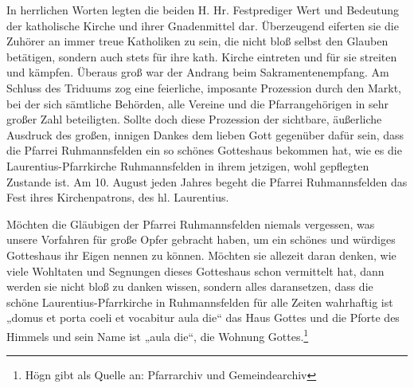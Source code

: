 \documentclass[12pt,a4paper]{book}
\begin{document}
In herrlichen Worten legten die beiden H. Hr. Festprediger Wert und
Bedeutung der katholische Kirche und ihrer Gnadenmittel dar. Überzeugend
eiferten sie die Zuhörer an immer treue Katholiken zu sein, die nicht
bloß selbst den Glauben betätigen, sondern auch stets für ihre kath.
Kirche eintreten und für sie streiten und kämpfen. Überaus groß war der
Andrang beim Sakramentenempfang. Am Schluss des Triduums zog eine
feierliche, imposante Prozession durch den Markt, bei der sich sämtliche
Behörden, alle Vereine und die Pfarrangehörigen in sehr großer Zahl
beteiligten. Sollte doch diese Prozession der sichtbare, äußerliche
Ausdruck des großen, innigen Dankes dem lieben Gott gegenüber dafür
sein, dass die Pfarrei Ruhmannsfelden ein so schönes Gotteshaus bekommen
hat, wie es die Laurentius-Pfarrkirche Ruhmannsfelden in ihrem jetzigen,
wohl gepflegten Zustande ist. Am 10. August jeden Jahres begeht die
Pfarrei Ruhmannsfelden das Fest ihres Kirchenpatrons, des hl.
Laurentius.

Möchten die Gläubigen der Pfarrei Ruhmannsfelden niemals vergessen, was
unsere Vorfahren für große Opfer gebracht haben, um ein schönes und
würdiges Gotteshaus ihr Eigen nennen zu können. Möchten sie allezeit
daran denken, wie viele Wohltaten und Segnungen dieses Gotteshaus schon
vermittelt hat, dann werden sie nicht bloß zu danken wissen, sondern
alles daransetzen, dass die schöne Laurentius-Pfarrkirche in
Ruhmannsfelden für alle Zeiten wahrhaftig ist „domus et porta coeli et
vocabitur aula die“ das Haus Gottes und die Pforte des Himmels und sein
Name ist „aula die“, die Wohnung Gottes.\footnote{Högn gibt als Quelle
an: Pfarrarchiv und Gemeindearchiv}
\end{document}
